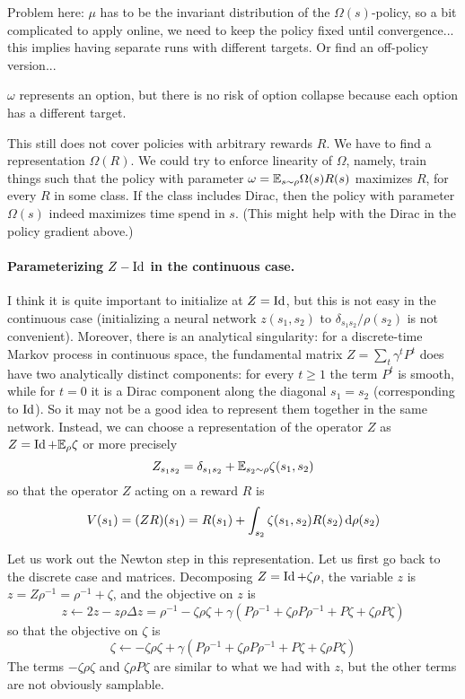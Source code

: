 \documentclass[11pt,a4paper]{article}
\begin{document}
Problem here: $\mu$ has to be the invariant distribution of the
$\Omega(s)$-policy, so a bit complicated to apply online, we need to keep
the policy fixed until convergence... this implies having separate runs
with different targets. Or find an off-policy version... 

$\omega$ represents an option, but there is no risk of option collapse
because each option has a different target.

This still does not cover policies with arbitrary rewards $R$. We have to
find a representation $\Omega(R)$. We could try to enforce linearity of
$\Omega$, namely, train things such that the policy with parameter
$\omega=\mathbb{E}_{s\sim \rho} \Omega(s)R(s)$ maximizes $R$, for every $R$ in some
class. If the class includes Dirac, then 
the policy with parameter
$\Omega(s)$ indeed maximizes time spend in $s$. (This might help with the
Dirac in the policy gradient above.)

\paragraph{Parameterizing $Z-\operatorname{Id}$ in the continuous case.} I think it is quite
important to initialize at $Z=\operatorname{Id}$, but this is not easy in the
continuous case (initializing a neural network $z(s_1,s_2)$ to
$\delta_{s_1s_2}/\rho(s_2)$ is not convenient). Moreover, there is an
analytical singularity: for a discrete-time Markov process in continuous
space, the fundamental matrix $Z=\sum_t \gamma^t P^t$ does have two
analytically distinct components: for every $t\geq 1$ the term $P^t$ is
smooth, while for $t=0$ it is a Dirac component along the diagonal
$s_1=s_2$ (corresponding to $\operatorname{Id}$). So it may not be a good idea to
represent them together in the same network. Instead, we can choose a
representation of the operator $Z$ as $Z=\operatorname{Id}+\mathbb{E}_\rho \zeta$ or more
precisely
\begin{equation}
Z_{s_1s_2}=\delta_{s_1s_2}+\mathbb{E}_{s_2\sim \rho} \zeta(s_1,s_2)
\end{equation}
so that the operator $Z$ acting on a reward $R$ is
\begin{equation}
V(s_1)=(ZR)(s_1)=R(s_1)+\int_{s_2} \zeta(s_1,s_2)R(s_2)\operatorname{d}\!{}\rho(s_2)
\end{equation}

Let us work out the Newton step in this representation. Let us first go
back to the discrete case and matrices. Decomposing $Z=\operatorname{Id}+\zeta\rho$,
the variable $z$ is $z=Z\rho^{-1}=\rho^{-1}+\zeta$, and the objective on
$z$ is 
\begin{equation}
z\gets 2z-z\rho\Delta z=\rho^{-1}-\zeta\rho\zeta+\gamma(
P\rho^{-1}+\zeta\rho P \rho^{-1}+P\zeta+\zeta\rho P \zeta)
\end{equation}
so that the objective on $\zeta$ is
\begin{equation}
\zeta\gets -\zeta\rho\zeta+\gamma(
P\rho^{-1}+\zeta\rho P \rho^{-1}+P\zeta+\zeta\rho P \zeta)
\end{equation}
The terms $-\zeta\rho \zeta$ and $\zeta\rho
P \zeta$ are similar to what we had with $z$, but the other terms are not
obviously samplable.
\end{document}
